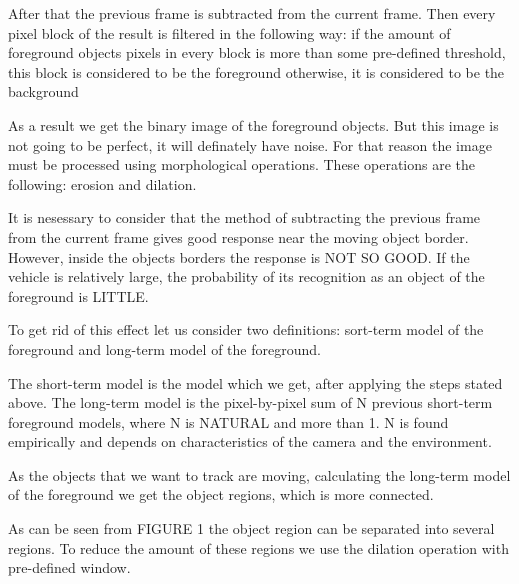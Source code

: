 \documentclass[12pt,a4paper,oneside,titlepage]{article}
\begin{document}
 



After that the previous frame is subtracted from the current frame.
Then every pixel block of the result is filtered in the following way:
if the amount of foreground objects pixels in every block is more than some pre-defined threshold, this block is considered to be the foreground
otherwise, it is considered to be the background

As a result we get the binary image of the foreground objects.
But this image is not going to be perfect, it will definately have noise.
For that reason the image must be processed using morphological operations.
These operations are the following: erosion and dilation.

It is nesessary to consider that the method of subtracting the previous frame from the current frame gives good response near the moving object border. 
However, inside the objects borders the response is NOT SO GOOD.
If the vehicle is relatively large, the probability of its recognition as an object of the foreground is LITTLE.

To get rid of this effect let us consider two definitions: sort-term model of the foreground and long-term model of the foreground.

The short-term model is the model which we get, after applying the steps stated above.
The long-term model is the pixel-by-pixel sum of N previous short-term foreground models, where N is NATURAL and more than 1.  
N is found empirically and depends on characteristics of the camera and the environment.

As the objects that we want to track are moving, calculating the long-term model of  the foreground we get the object regions, which is more connected.

As can be seen from FIGURE 1 the object region can be separated into several regions.
To reduce the amount of these regions we use the dilation operation with pre-defined window.
\end{document}

